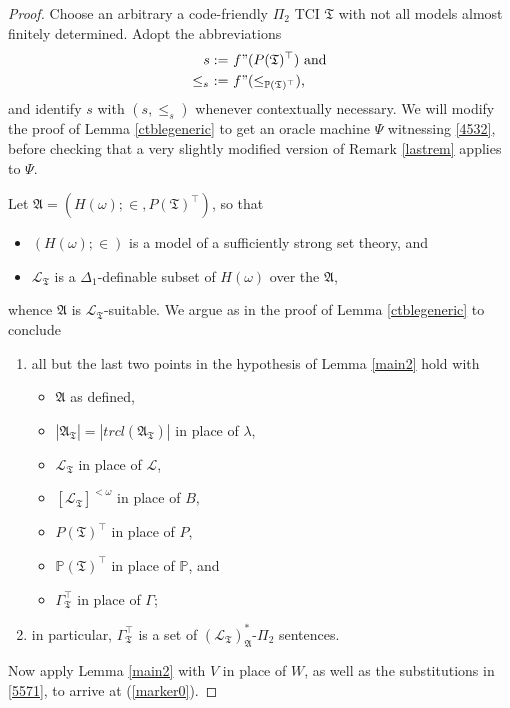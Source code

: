 \documentclass[12pt]{article}
\numberwithin{equation}{section}
\begin{document}
\begin{proof}
Choose an arbitrary a code-friendly $\Pi_2$ TCI $\mathfrak{T}$ with not all models almost finitely determined. Adopt the abbreviations
\begin{align*}
    s := \ & f" (P(\mathfrak{T})^{\top}) \text{ and} \\
    \leq_s \ := \ & f" (\leq_{\mathbb{P}(\mathfrak{T})^{\top}}) \text{,} 
\end{align*}
and identify $s$ with $(s, \leq_s)$ whenever contextually necessary. We will modify the proof of Lemma \ref{ctblegeneric} to get an oracle machine $\Psi$ witnessing \ref{4532}, before checking that a very slightly modified version of Remark \ref{lastrem} applies to $\Psi$. 

Let $\mathfrak{A} = (H(\omega); \in, P(\mathfrak{T})^{\top})$, so that 
\begin{itemize}
    \item $(H(\omega); \in)$ is a model of a sufficiently strong set theory, and
    \item $\mathcal{L}_{\mathfrak{T}}$ is a $\Delta_1$-definable subset of $H(\omega)$ over the $\mathfrak{A}$,
\end{itemize}
whence $\mathfrak{A}$ is $\mathcal{L}_{\mathfrak{T}}$-suitable. We argue as in the proof of Lemma \ref{ctblegeneric} to conclude 
\begin{enumerate}[label=(\arabic*)]
    \item\label{5571} all but the last two points in the hypothesis of Lemma \ref{main2} hold with
    \begin{itemize}[label=$\circ$]
        \item $\mathfrak{A}$ as defined,
        \item $|\mathfrak{A}_{\mathfrak{T}}| = |trcl(\mathfrak{A}_{\mathfrak{T}})|$ in place of $\lambda$,
        \item $\mathcal{L}_{\mathfrak{T}}$ in place of $\mathcal{L}$,
        \item $[\mathcal{L}_{\mathfrak{T}}]^{< \omega}$ in place of $B$,
        \item $P(\mathfrak{T})^{\top}$ in place of $P$,
        \item $\mathbb{P}(\mathfrak{T})^{\top}$ in place of $\mathbb{P}$, and
        \item $\Gamma_{\mathfrak{T}}^{\top}$ in place of $\Gamma$;
    \end{itemize} 
    \item\label{5572} in particular, $\Gamma_{\mathfrak{T}}^{\top}$ is a set of $(\mathcal{L}_{\mathfrak{T}})^*_{\mathfrak{A}}$-$\Pi_2$ sentences.
\end{enumerate}
Now apply Lemma \ref{main2} with $V$ in place of $W$, as well as the substitutions in \ref{5571}, to arrive at (\ref{marker0}).


\end{proof}
\end{document}
